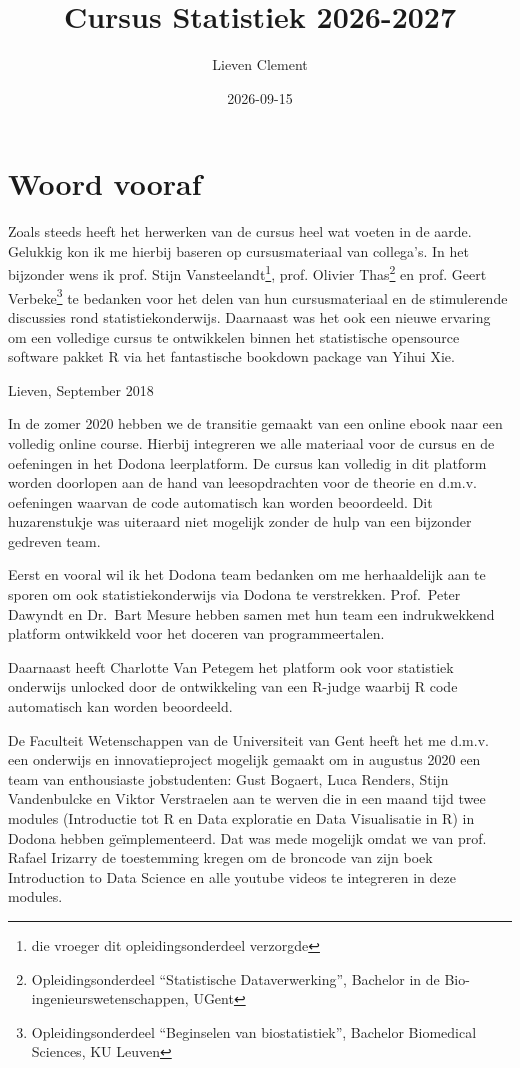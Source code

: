 \documentclass[
  12pt,dutch]{book}
\title{Cursus Statistiek 2026-2027}
\author{Lieven Clement}
\date{2026-09-15}
\theoremstyle{definition}
\theoremstyle{definition}
\theoremstyle{definition}
\theoremstyle{definition}
\theoremstyle{remark}
\begin{document}
\maketitle

{
\setcounter{tocdepth}{1}
\tableofcontents
}
\chapter*{Woord vooraf}\label{woord-vooraf}

Zoals steeds heeft het herwerken van de cursus heel wat voeten in de aarde. Gelukkig kon ik me hierbij baseren op cursusmateriaal van collega's. In het bijzonder wens ik prof. Stijn Vansteelandt\footnote{die vroeger dit opleidingsonderdeel verzorgde}, prof. Olivier Thas\footnote{Opleidingsonderdeel ``Statistische Dataverwerking'', Bachelor in de Bio-ingenieurswetenschappen, UGent} en prof. Geert Verbeke\footnote{Opleidingsonderdeel ``Beginselen van biostatistiek'', Bachelor Biomedical Sciences, KU Leuven} te bedanken voor het delen van hun cursusmateriaal en de stimulerende discussies rond statistiekonderwijs. Daarnaast was het ook een nieuwe ervaring om een volledige cursus te ontwikkelen binnen het statistische opensource software pakket R via het fantastische bookdown package van Yihui Xie.

Lieven, September 2018

In de zomer 2020 hebben we de transitie gemaakt van een online ebook naar een volledig online course.
Hierbij integreren we alle materiaal voor de cursus en de oefeningen in het Dodona leerplatform.
De cursus kan volledig in dit platform worden doorlopen aan de hand van leesopdrachten voor de theorie en d.m.v. oefeningen waarvan de code automatisch kan worden beoordeeld.
Dit huzarenstukje was uiteraard niet mogelijk zonder de hulp van een bijzonder gedreven team.

Eerst en vooral wil ik het Dodona team bedanken om me herhaaldelijk aan te sporen om ook statistiekonderwijs via Dodona te verstrekken. Prof.~Peter Dawyndt en Dr.~Bart Mesure hebben samen met hun team een indrukwekkend platform ontwikkeld voor het doceren van programmeertalen.

Daarnaast heeft Charlotte Van Petegem het platform ook voor statistiek onderwijs unlocked door de ontwikkeling van een R-judge waarbij R code automatisch kan worden beoordeeld.

De Faculteit Wetenschappen van de Universiteit van Gent heeft het me d.m.v. een onderwijs en innovatieproject mogelijk gemaakt om in augustus 2020 een team van enthousiaste jobstudenten: Gust Bogaert, Luca Renders, Stijn Vandenbulcke en Viktor Verstraelen aan te werven die in een maand tijd twee modules (Introductie tot R en Data exploratie en Data Visualisatie in R) in Dodona hebben geïmplementeerd. Dat was mede mogelijk omdat we van prof. Rafael Irizarry de toestemming kregen om de broncode van zijn boek Introduction to Data Science en alle youtube videos te integreren in deze modules.
\end{document}
